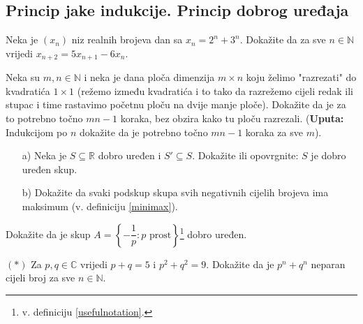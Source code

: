 \subsection*{Princip jake indukcije. Princip dobrog uređaja}
\begin{exercise}
Neka je $(x_n)$ niz realnih brojeva dan sa $x_n=2^n+3^n$. Dokažite da za sve $n\in \mathbb{N}$ vrijedi $x_{n+2}=5x_{n+1}-6x_n$.
\end{exercise}
\begin{exercise}
Neka su $m, n\in \mathbb{N}$ i neka je dana ploča dimenzija $m\times n$ koju želimo "razrezati" do kvadratića $1\times 1$ (režemo između kvadratića i to tako da razrežemo cijeli redak ili stupac i time rastavimo početnu ploču na dvije manje ploče). Dokažite da je za to potrebno točno $mn-1$ koraka, bez obzira kako tu ploču razrezali. (\textbf{Uputa: } Indukcijom po $n$ dokažite da je potrebno točno $mn-1$ koraka za sve $m$).
\end{exercise}
\begin{exercise} \textbf{}
\begin{itemize}
\item[a)] Neka je $S\subseteq \mathbb{R}$ dobro uređen i $S'\subseteq S$. Dokažite ili opovrgnite: $S$ je dobro uređen skup.
\item[b)] Dokažite da svaki podskup skupa svih negativnih cijelih brojeva ima maksimum (v. definiciju \ref{minimax}).
\end{itemize}
\end{exercise}
\begin{exercise}
Dokažite da je skup $A=\left\{-\dfrac{1}{p} : p \text{ prost}\right\}$\footnote{v. definiciju \ref{usefulnotation}.} dobro uređen.
\end{exercise}
\begin{exercise} $(*)$
Za $p, q\in \mathbb{C}$ vrijedi $p+q=5$ i $p^2+q^2=9$. Dokažite da je $p^n+q^n$ neparan cijeli broj za sve $n\in \mathbb{N}$.
\end{exercise}